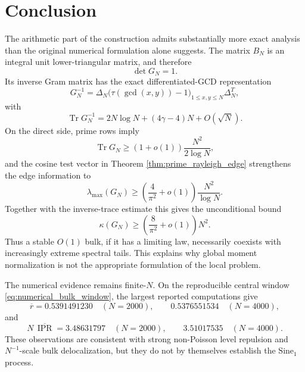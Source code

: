 \documentclass[11pt]{amsart}
\numberwithin{equation}{section}
\theoremstyle{plain}
\theoremstyle{definition}
\theoremstyle{remark}
\newcommand{\Tr}{\operatorname{Tr}}
\newcommand{\IPR}{\operatorname{IPR}}
\begin{document}
\section{Conclusion}
\label{sec:conclusion}

The arithmetic part of the construction admits substantially more exact analysis than the original numerical formulation alone suggests.  The matrix $B_N$ is an integral unit lower-triangular matrix, and therefore
\begin{equation}
\det G_N=1.
\end{equation}
Its inverse Gram matrix has the exact differentiated-GCD representation
\begin{equation}
G_N^{-1}=\Delta_N
\bigl(\tau(\gcd(x,y))-1\bigr)_{1\le x,y\le N}
\Delta_N^T,
\end{equation}
with
\begin{equation}
\Tr G_N^{-1}
=2N\log N+(4\gamma-4)N+O(\sqrt N).
\end{equation}
On the direct side, prime rows imply
\begin{equation}
\Tr G_N\ge(1+o(1))\frac{N^2}{2\log N},
\end{equation}
and the cosine test vector in Theorem \ref{thm:prime_rayleigh_edge} strengthens the edge information to
\begin{equation}
\lambda_{\max}(G_N)
\ge\left(\frac4{\pi^2}+o(1)\right)\frac{N^2}{\log N}.
\end{equation}
Together with the inverse-trace estimate this gives the unconditional bound
\begin{equation}
\kappa(G_N)
\ge\left(\frac8{\pi^2}+o(1)\right)N^2.
\end{equation}
Thus a stable $O(1)$ bulk, if it has a limiting law, necessarily coexists with increasingly extreme spectral tails.  This explains why global moment normalization is not the appropriate formulation of the local problem.

The numerical evidence remains finite-$N$.  On the reproducible central window \eqref{eq:numerical_bulk_window}, the largest reported computations give
\begin{equation}
\overline r
=0.5391491230\quad(N=2000),
\qquad
0.5376551534\quad(N=4000),
\end{equation}
and
\begin{equation}
N\,\overline{\IPR}
=3.48631797\quad(N=2000),
\qquad
3.51017535\quad(N=4000).
\end{equation}
These observations are consistent with strong non-Poisson level repulsion and $N^{-1}$-scale bulk delocalization, but they do not by themselves establish the $\mathrm{Sine}_1$ process.
\end{document}
